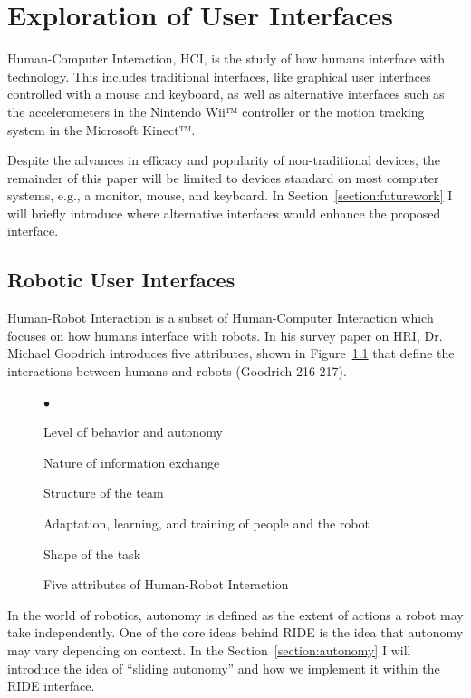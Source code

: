 \chapter{Exploration of User Interfaces}
\label{chapter:ui}

Human-Computer Interaction, HCI, is the study of how humans interface with technology. This includes traditional interfaces, like graphical user interfaces controlled with a mouse and keyboard, as well as alternative interfaces such as the accelerometers in the Nintendo Wii™ controller or the motion tracking system in the Microsoft Kinect™.

Despite the advances in efficacy and popularity of non-traditional devices, the remainder of this paper will be limited to devices standard on most computer systems, e.g., a monitor, mouse, and keyboard. In Section~\ref{section:futurework} I will briefly introduce where alternative interfaces would enhance the proposed interface.

\section{Robotic User Interfaces}

Human-Robot Interaction is a subset of Human-Computer Interaction which focuses on how humans interface with robots. In his survey paper on HRI, Dr. Michael Goodrich introduces five attributes, shown in Figure~\ref{fig:five-attributes} that define the interactions between humans and robots (Goodrich 216-217).

\begin{figure}[ht]
	\makebox[\textwidth]{\hrulefill}
	\begin{list}{$\bullet$}
		\item Level of behavior and autonomy
		\item Nature of information exchange
		\item Structure of the team
		\item Adaptation, learning, and training of people and the robot
		\item Shape of the task
	\end{list}
	\makebox[\textwidth]{\hrulefill}
	\caption{Five attributes of Human-Robot Interaction \label{fig:five-attributes}}
\end{figure}

In the world of robotics, autonomy is defined as the extent of actions a robot may take independently. One of the core ideas behind RIDE is the idea that autonomy may vary depending on context. In the Section~\ref{section:autonomy} I will introduce the idea of ``sliding autonomy'' and how we implement it within the RIDE interface.

